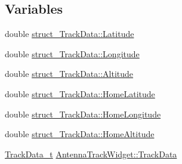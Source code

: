 \subsection*{\-Variables}
\begin{DoxyCompactItemize}
\item 
double \hyperlink{group___antenna_track_gadget_plugin_ga412a0215352cff81241572b0637ca6d5}{struct\-\_\-\-Track\-Data\-::\-Latitude}
\item 
double \hyperlink{group___antenna_track_gadget_plugin_gadd67067451f9adf6f25e45bcb7498a32}{struct\-\_\-\-Track\-Data\-::\-Longitude}
\item 
double \hyperlink{group___antenna_track_gadget_plugin_ga528ec049631eed362529f9ea5fd30b99}{struct\-\_\-\-Track\-Data\-::\-Altitude}
\item 
double \hyperlink{group___antenna_track_gadget_plugin_gad25500d6984ee3227abe9b2663c0a975}{struct\-\_\-\-Track\-Data\-::\-Home\-Latitude}
\item 
double \hyperlink{group___antenna_track_gadget_plugin_ga297bb9a225f2fa6033327e0d99bc5eac}{struct\-\_\-\-Track\-Data\-::\-Home\-Longitude}
\item 
double \hyperlink{group___antenna_track_gadget_plugin_ga0bb6374ee3a9a6f864fbd03a1c791256}{struct\-\_\-\-Track\-Data\-::\-Home\-Altitude}
\item 
\hyperlink{group___antenna_track_gadget_plugin_ga2a189738d52fd5df21e4a823d19ad1ac}{\-Track\-Data\-\_\-t} \hyperlink{group___antenna_track_gadget_plugin_ga18b3b7f2868671ca1d6e117f0bbccd90}{\-Antenna\-Track\-Widget\-::\-Track\-Data}
\end{DoxyCompactItemize}
